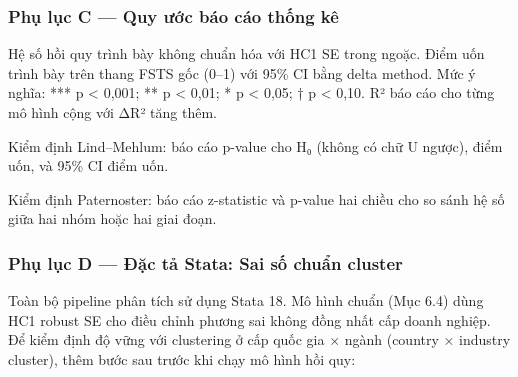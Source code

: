 \documentclass[12pt,a4paper]{article}
\begin{document}
\hypertarget{phux1ee5-lux1ee5c-c--quy-ux1b0ux1edbc-buxe1o-cuxe1o-thux1ed1ng-kuxea}{%
\subsubsection{Phụ lục C --- Quy ước báo cáo thống
kê}\label{phux1ee5-lux1ee5c-c--quy-ux1b0ux1edbc-buxe1o-cuxe1o-thux1ed1ng-kuxea}}

Hệ số hồi quy trình bày không chuẩn hóa với HC1 SE trong ngoặc. Điểm uốn
trình bày trên thang FSTS gốc (0--1) với 95\% CI bằng delta method. Mức
ý nghĩa: *** p \textless{} 0,001; ** p \textless{} 0,01; * p \textless{}
0,05; † p \textless{} 0,10. R² báo cáo cho từng mô hình cộng với ΔR²
tăng thêm.

Kiểm định Lind--Mehlum: báo cáo p-value cho H₀ (không có chữ U ngược),
điểm uốn, và 95\% CI điểm uốn.

Kiểm định Paternoster: báo cáo z-statistic và p-value hai chiều cho so
sánh hệ số giữa hai nhóm hoặc hai giai đoạn.

\hypertarget{phux1ee5-lux1ee5c-d--ux111ux1eb7c-tux1ea3-stata-sai-sux1ed1-chuux1ea9n-cluster}{%
\subsubsection{Phụ lục D --- Đặc tả Stata: Sai số chuẩn
cluster}\label{phux1ee5-lux1ee5c-d--ux111ux1eb7c-tux1ea3-stata-sai-sux1ed1-chuux1ea9n-cluster}}

Toàn bộ pipeline phân tích sử dụng Stata 18. Mô hình chuẩn (Mục 6.4)
dùng HC1 robust SE cho điều chỉnh phương sai không đồng nhất cấp doanh
nghiệp. Để kiểm định độ vững với clustering ở cấp quốc gia × ngành
(country × industry cluster), thêm bước sau trước khi chạy mô hình hồi
quy:
\end{document}
